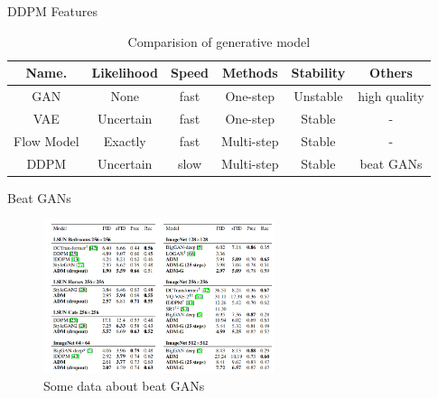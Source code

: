 \documentclass[aspectratio=169]{beamer}
\begin{document}
\begin{frame}{DDPM Features}
    \begin{table}
        \begin{tabular}{| c || c | c | c | c | c |  }
            \hline
            Name.      & Likelihood & Speed & Methods    & Stability & Others       \\
            \hline \hline
            GAN        & None       & fast  & One-step   & Unstable  & high quality \\
            VAE        & Uncertain  & fast  & One-step   & Stable    & -            \\
            Flow Model & Exactly    & fast  & Multi-step & Stable    & -            \\
            DDPM       & Uncertain  & slow  & Multi-step & Stable    & beat GANs    \\
            \hline
        \end{tabular}
        \caption{Comparision of generative model}
    \end{table}
\end{frame}

\begin{frame}{Beat GANs}
    \centering
    \begin{figure}
        \includegraphics[height=4.5cm]{../pic/beat-GANs.png}
        \caption{Some data about beat GANs}
    \end{figure}
\end{frame}
\end{document}
